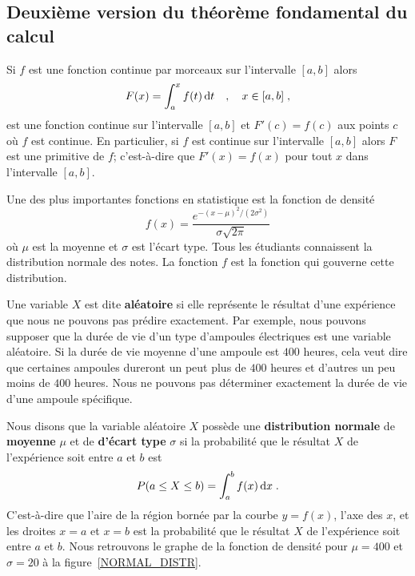 {\subsection{Deuxième version du théorème fondamental du calcul}

\begin{theorem}
Si $f$ est une fonction continue par morceaux sur l'intervalle $[a,b]$
alors
\[
F(x) = \int_a^x f(t) \,\mathrm{d}t  \quad , \quad x\in [a,b] \; ,
\]
est une fonction continue sur l'intervalle $[a,b]$ et $F'(c) = f(c)$
aux points $c$ où $f$ est continue.  En particulier, si $f$ est
continue sur l'intervalle $[a,b]$ alors $F$ est une primitive de $f$;
c'est-à-dire que $F'(x) = f(x)$ pour tout $x$ dans l'intervalle
$[a,b]$.
\end{theorem}

\begin{egg}
Une des plus importantes fonctions en statistique est la fonction de
densité
\[
f(x) = \frac{e^{-(x-\mu)^2/(2\sigma^2)}}{\sigma \sqrt{2\pi}}
\]
où $\mu$ est la moyenne et $\sigma$ est l'écart type.   Tous les
étudiants connaissent la distribution normale des notes.  La fonction
$f$ est la fonction qui gouverne cette distribution.

Une variable $X$ est dite {\bfseries aléatoire} si elle représente le
résultat d'une expérience que nous ne pouvons pas prédire exactement.
Par exemple, nous pouvons supposer que la durée de vie d'un type d'ampoules
électriques est une variable aléatoire.  Si
la durée de vie moyenne d'une ampoule est $400$ heures,
cela veut dire que certaines ampoules dureront un peut plus de $400$
heures et d'autres un peu moins de $400$ heures.  Nous ne pouvons pas
déterminer exactement la durée de vie d'une ampoule spécifique.

Nous disons que la variable aléatoire $X$ possède une
{\bfseries distribution normale} de
{\bfseries moyenne} $\mu$ et de {\bfseries d'écart type} $\sigma$ si
la probabilité que le résultat $X$ de l'expérience soit entre $a$ et
$b$ est
\[
P(a\leq X \leq b) = \int_a^b f(x) \,\mathrm{d}x \; .
\]
C'est-à-dire que l'aire de la région bornée par la courbe
$y=f(x)$, l'axe des $x$, et les droites $x=a$ et $x=b$ est la
probabilité que le résultat $X$ de l'expérience soit entre $a$ et
$b$. Nous retrouvons le graphe de la fonction de densité pour
$\mu=400$ et $\sigma =20$ à la figure~\ref{NORMAL_DISTR}.


\end{egg}}
